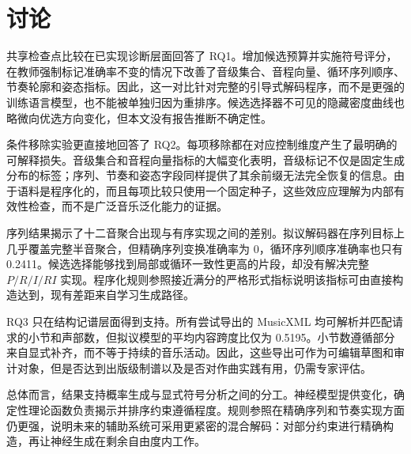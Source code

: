 \section{讨论}
\label{sec:discussion-zh}

共享检查点比较在已实现诊断层面回答了 RQ1。增加候选预算并实施符号评分，在教师强制标记准确率不变的情况下改善了音级集合、音程向量、循环序列顺序、节奏轮廓和姿态指标。因此，这一对比针对完整的引导式解码程序，而不是更强的训练语言模型，也不能被单独归因为重排序。候选选择器不可见的隐藏密度曲线也略微向优选方向变化，但本文没有报告推断不确定性。

条件移除实验更直接地回答了 RQ2。每项移除都在对应控制维度产生了最明确的可解释损失。音级集合和音程向量指标的大幅变化表明，音级标记不仅是固定生成分布的标签；序列、节奏和姿态字段同样提供了其余前缀无法完全恢复的信息。由于语料是程序化的，而且每项比较只使用一个固定种子，这些效应应理解为内部有效性检查，而不是广泛音乐泛化能力的证据。

序列结果揭示了十二音聚合出现与有序实现之间的差别。拟议解码器在序列目标上几乎覆盖完整半音聚合，但精确序列变换准确率为 0，循环序列顺序准确率也只有 0.2411。候选选择能够找到局部或循环一致性更高的片段，却没有解决完整 $P/R/I/RI$ 实现。程序化规则参照接近满分的严格形式指标说明该指标可由直接构造达到，现有差距来自学习生成路径。

RQ3 只在结构记谱层面得到支持。所有尝试导出的 MusicXML 均可解析并匹配请求的小节和声部数，但拟议模型的平均内容跨度比仅为 0.5195。小节数遵循部分来自显式补齐，而不等于持续的音乐活动。因此，这些导出可作为可编辑草图和审计对象，但是否达到出版级制谱以及是否对作曲实践有用，仍需专家评估。

总体而言，结果支持概率生成与显式符号分析之间的分工。神经模型提供变化，确定性理论函数负责揭示并排序约束遵循程度。规则参照在精确序列和节奏实现方面仍更强，说明未来的辅助系统可采用更紧密的混合解码：对部分约束进行精确构造，再让神经生成在剩余自由度内工作。
